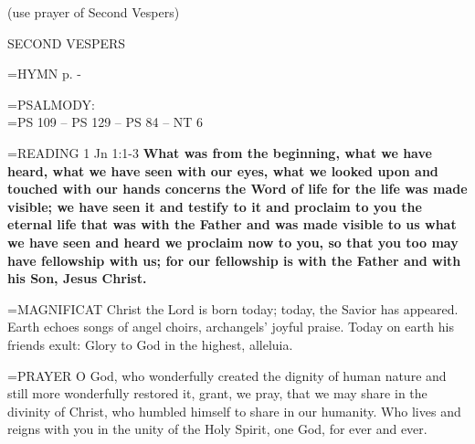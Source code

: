 (use prayer of Second Vespers)

\begin{flushleft}\normalsize SECOND VESPERS\\\end{flushleft}

\hangindent=\parindent \small{\uppercase{HYMN} p.  \pageref{christmas:firstHymn} - \pageref{christmas:lastHymn}\\}

\hangindent=\parindent \small{PSALMODY:}\\
\hangindent=\parindent  PS 109 -- PS 129 -- PS 84 -- NT 6\vspace{0.5em}

\hangindent=\parindent \small{READING}    1 Jn 1:1-3 \textbf{   What was from the beginning, what we have heard, what we have seen with our eyes, what we looked upon and touched with our hands concerns the Word of life for the life was made visible; we have seen it and testify to it and proclaim to you the eternal life that was with the Father and was made visible to us what we have seen and heard we proclaim now to you, so that you too may have fellowship with us; for our fellowship is with the Father and with his Son, Jesus Christ.\\}

\hangindent=\parindent \small{MAGNIFICAT 	Christ the Lord is born today; today, the Savior has appeared. Earth echoes songs of angel choirs, archangels' joyful praise. Today on earth his friends exult: Glory to God in the highest, alleluia.\\}

\hangindent=\parindent \small{PRAYER 	O God, who wonderfully created the dignity of human nature and still more wonderfully restored it, grant, we pray, that we may share in the divinity of Christ, who humbled himself to share in our humanity. Who lives and reigns with you in the unity of the Holy Spirit, one God, for ever and ever.}
